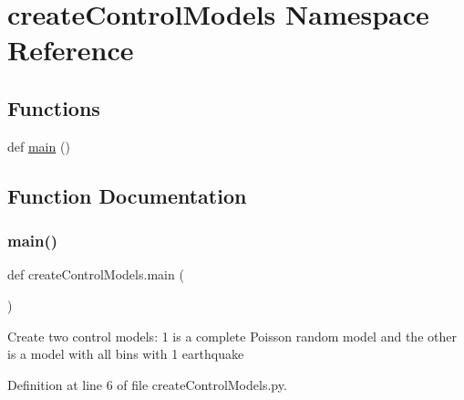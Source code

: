 \hypertarget{namespacecreate_control_models}{}\section{create\+Control\+Models Namespace Reference}
\label{namespacecreate_control_models}
\subsection*{Functions}
\begin{DoxyCompactItemize}
\item 
def \hyperlink{namespacecreate_control_models_a74a780ab8810756a528b3bddfd6d18c6}{main} ()
\end{DoxyCompactItemize}


\subsection{Function Documentation}
\mbox{\label{namespacecreate_control_models_a74a780ab8810756a528b3bddfd6d18c6}} 
\subsubsection{\texorpdfstring{main()}{main()}}
{\footnotesize\ttfamily def create\+Control\+Models.\+main (\begin{DoxyParamCaption}{ }\end{DoxyParamCaption})}

\begin{DoxyVerb}Create two control models: 1 is a complete Poisson random model and the other is a model with all bins with 1 earthquake
\end{DoxyVerb}
 

Definition at line 6 of file create\+Control\+Models.\+py.


